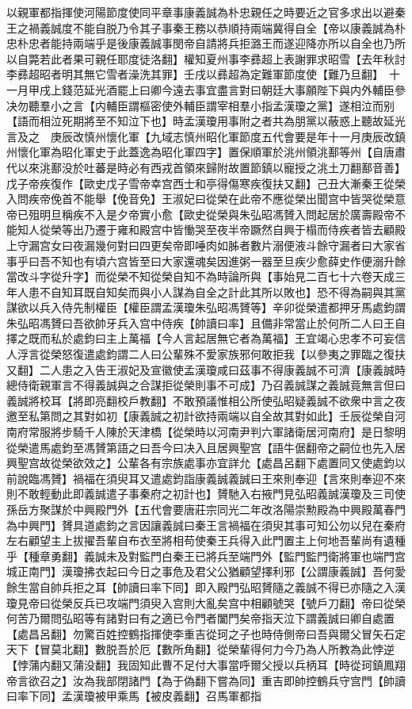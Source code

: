 以親軍都指揮使河陽節度使同平章事康義誠為朴忠親任之時要近之官多求出以避秦王之禍義誠度不能自脱乃令其子事秦王務以恭順持兩端冀得自全【帝以康義誠為朴忠朴忠者能持兩端乎是後康義誠事閔帝自請將兵拒潞王而遂迎降亦所以自全也乃所以自斃若此者果可親任耶度徒洛翻】權知夏州事李彞超上表謝罪求昭雪【去年秋討李彞超昭者明其無它雪者澡洗其罪】壬戌以彞超為定難軍節度使【難乃旦翻】　十一月甲戌上錢范延光酒罷上曰卿今遠去事宜盡言對曰朝廷大事願陛下與内外輔臣參决勿聽羣小之言【内輔臣謂樞密使外輔臣謂宰相羣小指孟漢瓊之黨】遂相泣而别【語而相泣死期將至不知泣下也】時孟漢瓊用事附之者共為朋黨以蔽惑上聽故延光言及之　庚辰改慎州懷化軍【九域志慎州昭化軍節度五代會要是年十一月庚辰改鎮州懷化軍為昭化軍史于此蓋逸為昭化軍四字】置保順軍於洮州領洮鄯等州【自唐肅代以來洮鄯没於吐蕃是時必有西戎首領來歸附故置節鎮以寵授之洮土刀翻鄯音善】　戊子帝疾復作【歐史戊子雪帝幸宫西士和亭得傷寒疾復扶又翻】己丑大漸秦王從榮入問疾帝俛首不能舉【俛音免】王淑妃曰從榮在此帝不應從榮出聞宫中皆哭從榮意帝已殂明旦稱疾不入是夕帝實小愈【歐史從榮與朱弘昭馮贇入問起居於廣壽殿帝不能知人從榮等出乃遷于雍和殿宫中皆慟哭至夜半帝蹶然自興于榻而侍疾者皆去顧殿上守漏宫女曰夜漏幾何對曰四更矣帝即唾肉如胏者數片溺便液斗餘守漏者曰大家省事乎曰吾不知也有頃六宫皆至曰大家還魂矣因進粥一器至旦疾少愈薛史作便溺升餘當改斗字從升字】而從榮不知從榮自知不為時論所與【事始見二百七十六卷天成三年人患不自知耳既自知矣而與小人謀為自全之計此其所以敗也】恐不得為嗣與其黨謀欲以兵入侍先制權臣【權臣謂孟漢瓊朱弘昭馮贇等】辛卯從榮遣都押牙馬處鈞謂朱弘昭馮贇曰吾欲帥牙兵入宫中侍疾【帥讀曰率】且備非常當止於何所二人曰王自擇之既而私於處鈞曰主上萬福【今人言起居無它者為萬福】王宜竭心忠孝不可妄信人浮言從榮怒復遣處鈞謂二人曰公輩殊不愛家族邪何敢拒我【以參夷之罪臨之復扶又翻】二人患之入告王淑妃及宣徽使孟漢瓊咸曰茲事不得康義誠不可濟【康義誠時總侍衛親軍言不得義誠與之合謀拒從榮則事不可成】乃召義誠謀之義誠竟無言但曰義誠將校耳【將即亮翻校戶教翻】不敢預議惟相公所使弘昭疑義誠不欲衆中言之夜邀至私第問之其對如初【康義誠之初計欲持兩端以自全故其對如此】壬辰從榮自河南府常服將步騎千人陳於天津橋【從榮時以河南尹判六軍諸衛居河南府】是日黎明從榮遣馬處鈞至馮贇第語之曰吾今曰决入且居興聖宫【語牛倨翻帝之嗣位也先入居興聖宫故從榮欲效之】公輩各有宗族處事亦宜詳允【處昌呂翻下處置同又使處鈞以前說臨馮贇】禍福在須臾耳又遣處鈞詣康義誠義誠曰王來則奉迎【言來則奉迎不來則不敢輕動此即義誠遣子事秦府之初計也】贇馳入右掖門見弘昭義誠漢瓊及三司使孫岳方聚謀於中興殿門外【五代會要唐莊宗同光二年改洛陽崇勲殿為中興殿萬春門為中興門】贇具道處鈞之言因讓義誠曰秦王言禍福在須臾其事可知公勿以兒在秦府左右顧望主上拔擢吾輩自布衣至將相苟使秦王兵得入此門置主上何地吾輩尚有遺種乎【種章勇翻】義誠未及對監門白秦王已將兵至端門外【監門監門衛將軍也端門宫城正南門】漢瓊拂衣起曰今日之事危及君父公猶顧望擇利邪【公謂康義誠】吾何愛餘生當自帥兵拒之耳【帥讀曰率下同】即入殿門弘昭贇隨之義誠不得已亦隨之入漢瓊見帝曰從榮反兵已攻端門須臾入宫則大亂矣宫中相顧號哭【號戶刀翻】帝曰從榮何苦乃爾問弘昭等有諸對曰有之適已令門者闔門矣帝指天泣下謂義誠曰卿自處置【處昌呂翻】勿驚百姓控鶴指揮使李重吉從珂之子也時侍側帝曰吾與爾父冒矢石定天下【冒莫北翻】數脱吾於厄【數所角翻】從榮輩得何力今乃為人所教為此悖逆【悖蒲内翻又蒲没翻】我固知此曹不足付大事當呼爾父授以兵柄耳【時從珂鎮鳳翔帝言欲召之】汝為我部閉諸門【為于偽翻下嘗為同】重吉即帥控鶴兵守宫門【帥讀曰率下同】孟漢瓊被甲乘馬【被皮義翻】召馬軍都指